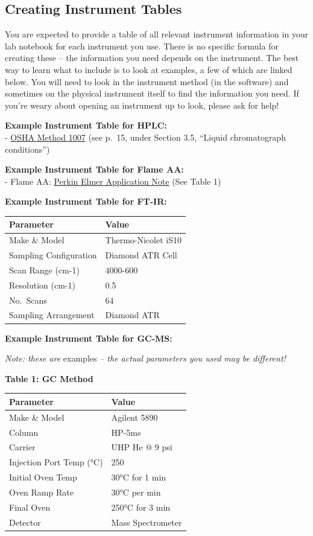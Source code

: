 \documentclass[]{tufte-book}
\begin{document}
\hypertarget{creating-instrument-tables}{%
\subsection*{Creating Instrument Tables}\label{creating-instrument-tables}}

You are expected to provide a table of all relevant instrument information in your lab notebook for each instrument you use. There is no specific formula for creating these -- the information you need depends on the instrument. The best way to learn what to include is to look at examples, a few of which are linked below. You will need to look in the instrument method (in the software) and sometimes on the physical instrument itself to find the information you need. If you're weary about opening an instrument up to look, please ask for help!

\textbf{Example Instrument Table for HPLC:}\\
- \href{https://www.osha.gov/dts/sltc/methods/mdt/mdt1007/1007.pdf}{OSHA Method 1007} (see p.~15, under Section 3.5, ``Liquid chromatograph conditions'')

\textbf{Example Instrument Table for Flame AA:}\\
- Flame AA: \href{https://www.perkinelmer.com/lab-solutions/resources/docs/PinAAcleMineralsinVitaminsbyFAAAppNote.pdf}{Perkin Elmer Application Note} (See Table 1)

\textbf{Example Instrument Table for FT-IR:}

\begin{longtable}[]{@{}ll@{}}
\toprule
Parameter & Value\tabularnewline
\midrule
\endhead
Make \& Model & Thermo-Nicolet iS10\tabularnewline
Sampling Configuration & Diamond ATR Cell\tabularnewline
Scan Range (cm-1) & 4000-600\tabularnewline
Resolution (cm-1) & 0.5\tabularnewline
No.~Scans & 64\tabularnewline
Sampling Arrangement & Diamond ATR\tabularnewline
\bottomrule
\end{longtable}

\textbf{Example Instrument Table for GC-MS:}

\emph{Note: these are} examples \emph{-- the actual parameters you used may be different!}

\textbf{Table 1: GC Method}

\begin{longtable}[]{@{}ll@{}}
\toprule
Parameter & Value\tabularnewline
\midrule
\endhead
Make \& Model & Agilent 5890\tabularnewline
Column & HP-5ms\tabularnewline
Carrier & UHP He @ 9 psi\tabularnewline
Injection Port Temp (°C) & 250\tabularnewline
Initial Oven Temp & 30°C for 1 min\tabularnewline
Oven Ramp Rate & 30°C per min\tabularnewline
Final Oven & 250°C for 3 min\tabularnewline
Detector & Mass Spectrometer\tabularnewline
\bottomrule
\end{longtable}
\end{document}
